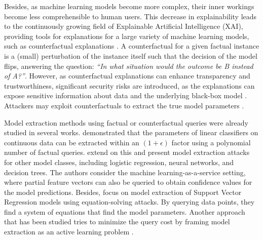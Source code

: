 \documentclass{article}
\begin{document}
Besides, as machine learning models become more complex, their inner workings become less comprehensible to human users. This decrease in explainability leads to the continuously growing field of Explainable Artificial Intelligence (XAI), providing tools for explanations for a large variety of machine learning models, such as counterfactual explanations \citep{wachter2017counterfactual}. A counterfactual for a given factual instance is a (small) perturbation of the instance itself such that the decision of the model flips, answering the question: \textit{``In what situation would the outcome be B instead of A?''}. However, as counterfactual explanations can enhance transparency and trustworthiness, significant security risks are introduced, as the explanations can expose sensitive information about data and the underlying black-box model \citep{shokri2021privacy,nguyen2024survey,milli2019model,Oksuz_2024}. Attackers may exploit counterfactuals to extract the true model parameters  \citep{khouna2025counterfactuals}.

Model extraction methods using factual or counterfactual queries were already studied in several works. \citet{lowd2005adversarial} demonstrated that the parameters of linear classifiers on continuous data can be extracted within an $(1+\epsilon)$ factor using a polynomial number of factual queries. \citet{tramer2016stealing} extend on this and present model extraction attacks for other model classes, including logistic regression, neural networks, and decision trees. The authors consider the machine learning-as-a-service setting, where partial feature vectors can also be queried to obtain confidence values for the model predictions. Besides, \citet{reith2019efficiently} focus on model extraction of Support Vector Regression models using equation-solving attacks. By querying data points, they find a system of equations that find the model parameters. Another approach that has been studied tries to minimize the query cost by framing model extraction as an active learning problem \citep{chandrasekaran2020exploring,pal2020activethief}. 
\end{document}
